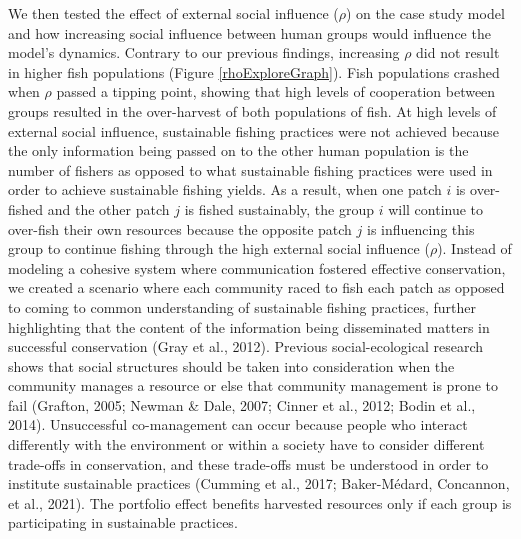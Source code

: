 \documentclass[
  12pt,
]{article}
\begin{document}
We then tested the effect of external social influence (\(\rho\)) on the case study model and how increasing social influence between human groups would influence the model's dynamics. Contrary to our previous findings, increasing \(\rho\) did not result in higher fish populations (Figure \ref{rhoExploreGraph}). Fish populations crashed when \(\rho\) passed a tipping point, showing that high levels of cooperation between groups resulted in the over-harvest of both populations of fish. At high levels of external social influence, sustainable fishing practices were not achieved because the only information being passed on to the other human population is the number of fishers as opposed to what sustainable fishing practices were used in order to achieve sustainable fishing yields. As a result, when one patch \(i\) is over-fished and the other patch \(j\) is fished sustainably, the group \(i\) will continue to over-fish their own resources because the opposite patch \(j\) is influencing this group to continue fishing through the high external social influence (\(\rho\)). Instead of modeling a cohesive system where communication fostered effective conservation, we created a scenario where each community raced to fish each patch as opposed to coming to common understanding of sustainable fishing practices, further highlighting that the content of the information being disseminated matters in successful conservation (Gray et al., 2012). Previous social-ecological research shows that social structures should be taken into consideration when the community manages a resource or else that community management is prone to fail (Grafton, 2005; Newman \& Dale, 2007; Cinner et al., 2012; Bodin et al., 2014). Unsuccessful co-management can occur because people who interact differently with the environment or within a society have to consider different trade-offs in conservation, and these trade-offs must be understood in order to institute sustainable practices (Cumming et al., 2017; Baker-Médard, Concannon, et al., 2021). The portfolio effect benefits harvested resources only if each group is participating in sustainable practices.
\end{document}
